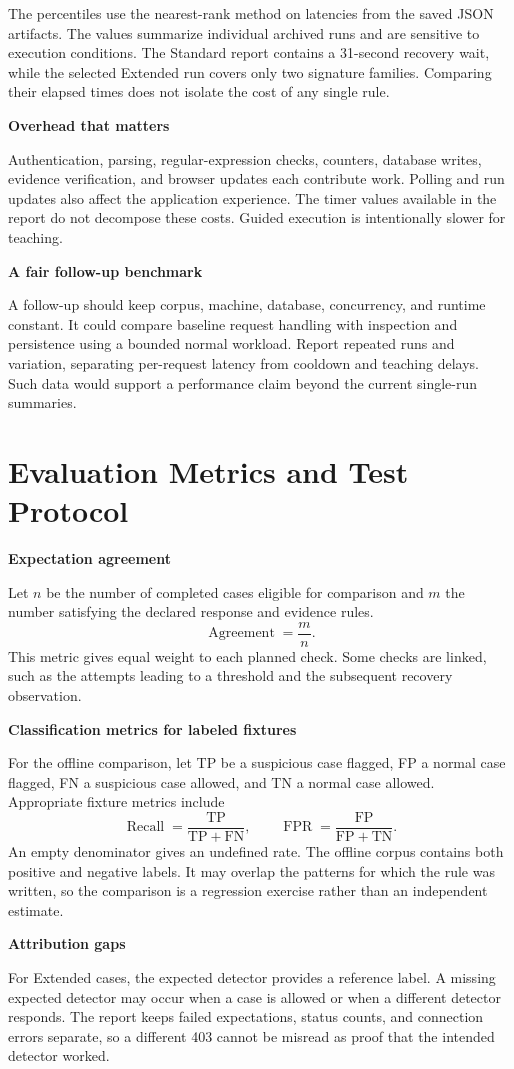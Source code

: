 \documentclass[11pt,letterpaper,oneside]{report}
\newcommand{\topic}[1]{\smallskip\noindent\textbf{#1}\par\nobreak\vspace{-.39em}}
\newcommand{\sheet}[1]{\clearpage\section{#1}}
\begin{document}
The percentiles use the nearest-rank method on latencies from the saved JSON artifacts. The values summarize individual archived runs and are sensitive to execution conditions. The Standard report contains a 31-second recovery wait, while the selected Extended run covers only two signature families. Comparing their elapsed times does not isolate the cost of any single rule.

\topic{Overhead that matters}
Authentication, parsing, regular-expression checks, counters, database writes, evidence verification, and browser updates each contribute work. Polling and run updates also affect the application experience. The timer values available in the report do not decompose these costs. Guided execution is intentionally slower for teaching.

\topic{A fair follow-up benchmark}
A follow-up should keep corpus, machine, database, concurrency, and runtime constant. It could compare baseline request handling with inspection and persistence using a bounded normal workload. Report repeated runs and variation, separating per-request latency from cooldown and teaching delays. Such data would support a performance claim beyond the current single-run summaries.

\sheet{Evaluation Metrics and Test Protocol}
\topic{Expectation agreement}
Let $n$ be the number of completed cases eligible for comparison and $m$ the number satisfying the declared response and evidence rules.
\[
 \operatorname{Agreement} = \frac{m}{n}.
\]
This metric gives equal weight to each planned check. Some checks are linked, such as the attempts leading to a threshold and the subsequent recovery observation.

\topic{Classification metrics for labeled fixtures}
For the offline comparison, let TP be a suspicious case flagged, FP a normal case flagged, FN a suspicious case allowed, and TN a normal case allowed. Appropriate fixture metrics include
\[
 \operatorname{Recall}=\frac{\mathrm{TP}}{\mathrm{TP}+\mathrm{FN}},
 \qquad
 \operatorname{FPR}=\frac{\mathrm{FP}}{\mathrm{FP}+\mathrm{TN}}.
\]
An empty denominator gives an undefined rate. The offline corpus contains both positive and negative labels. It may overlap the patterns for which the rule was written, so the comparison is a regression exercise rather than an independent estimate.

\topic{Attribution gaps}
For Extended cases, the expected detector provides a reference label. A missing expected detector may occur when a case is allowed or when a different detector responds. The report keeps failed expectations, status counts, and connection errors separate, so a different 403 cannot be misread as proof that the intended detector worked.
\end{document}
